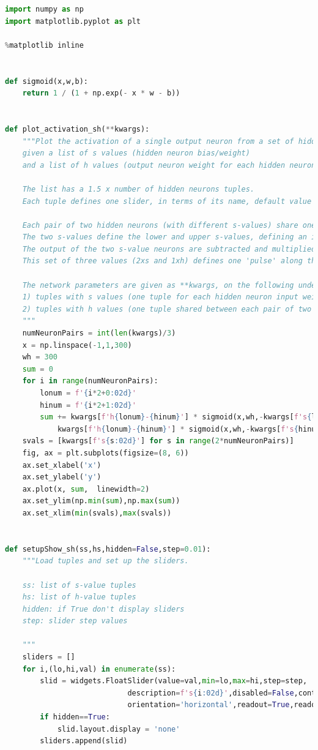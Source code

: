 \begin{lstlisting}[language=Python]
import numpy as np
import matplotlib.pyplot as plt

%matplotlib inline


def sigmoid(x,w,b):
    return 1 / (1 + np.exp(- x * w - b))
    

def plot_activation_sh(**kwargs):
    """Plot the activation of a single output neuron from a set of hidden neurons,
    given a list of s values (hidden neuron bias/weight)
    and a list of h values (output neuron weight for each hidden neuron).
    
    The list has a 1.5 x number of hidden neurons tuples.
    Each tuple defines one slider, in terms of its name, default value and lo/hi limits.
    
    Each pair of two hidden neurons (with different s-values) share one h-weight value.
    The two s-values define the lower and upper s-values, defining an interval on the x axis.
    The output of the two s-value neurons are subtracted and multiplied with the h-weight value.
    This set of three values (2xs and 1xh) defines one 'pulse' along the x-axis with height h.
    
    The network parameters are given as **kwargs, on the following understanding:
    1) tuples with s values (one tuple for each hidden neuron input weight, s=bias/weight)
    2) tuples with h values (one tuple shared between each pair of two hidden neurons)
    """
    numNeuronPairs = int(len(kwargs)/3)
    x = np.linspace(-1,1,300)
    wh = 300
    sum = 0
    for i in range(numNeuronPairs):
        lonum = f'{i*2+0:02d}'
        hinum = f'{i*2+1:02d}'
        sum += kwargs[f'h{lonum}-{hinum}'] * sigmoid(x,wh,-kwargs[f's{lonum}']*wh) - \
            kwargs[f'h{lonum}-{hinum}'] * sigmoid(x,wh,-kwargs[f's{hinum}']*wh) 
    svals = [kwargs[f's{s:02d}'] for s in range(2*numNeuronPairs)]
    fig, ax = plt.subplots(figsize=(8, 6))
    ax.set_xlabel('x')
    ax.set_ylabel('y')
    ax.plot(x, sum,  linewidth=2)
    ax.set_ylim(np.min(sum),np.max(sum))
    ax.set_xlim(min(svals),max(svals))

    
def setupShow_sh(ss,hs,hidden=False,step=0.01):
    """Load tuples and set up the sliders.
    
    ss: list of s-value tuples
    hs: list of h-value tuples
    hidden: if True don't display sliders
    step: slider step values
    
    """
    sliders = []
    for i,(lo,hi,val) in enumerate(ss):
        slid = widgets.FloatSlider(value=val,min=lo,max=hi,step=step,
                            description=f's{i:02d}',disabled=False,continuous_update=False,
                            orientation='horizontal',readout=True,readout_format='.2f')
        if hidden==True:
            slid.layout.display = 'none'
        sliders.append(slid)


\end{lstlisting}
